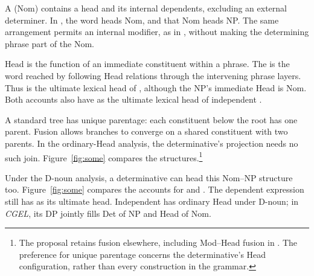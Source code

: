 \documentclass[12pt]{article}
\begin{document}
A  (Nom) contains a head and its internal dependents, excluding an external determiner. In , the word  heads Nom, and that Nom heads NP. The same arrangement permits an internal modifier, as in , without making the determining phrase part of the Nom.

Head is the function of an immediate constituent within a phrase. The  is the word reached by following Head relations through the intervening phrase layers. Thus  is the ultimate lexical head of , although the NP's immediate Head is Nom. Both accounts also have  as the ultimate lexical head of independent .

A standard tree has unique parentage: each constituent below the root has one parent. Fusion allows branches to converge on a shared constituent with two parents. In the ordinary-Head analysis, the determinative's projection needs no such join. Figure~\ref{fig:some} compares the structures.\footnote{The proposal retains fusion elsewhere, including Mod--Head fusion in . The preference for unique parentage concerns the determinative's Head configuration, rather than every construction in the grammar.}

Under the D-noun analysis, a determinative can head this Nom--NP structure too. Figure~\ref{fig:some} compares the accounts for  and . The dependent expression still has  as its ultimate head. Independent  has ordinary Head under D-noun; in \textit{CGEL}, its DP jointly fills Det of NP and Head of Nom.
\end{document}
